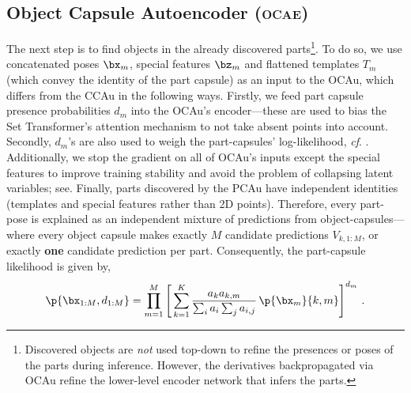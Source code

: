 \subsection{Object Capsule Autoencoder (\textsc{ocae})}
\label{sec:ocae}

The next step is to find objects in the already discovered parts\footnote{
    Discovered objects are {\it not} used top-down to refine the presences or poses of the parts during inference. However, the derivatives backpropagated via \gls{OCAu} refine the lower-level encoder network that infers the parts.
}.
To do so, we use concatenated poses $\bx_m$, special features $\bz_m$ and flattened templates $T_m$ (which convey the identity of the part capsule)
as an input to the \gls{OCAu}, which differs from the \gls{CCAu} in the following ways.
Firstly, we feed part capsule presence probabilities $d_m$ into the \gls{OCAu}'s encoder---these are used to bias the Set Transformer's attention mechanism to not take absent points into account.
Secondly, $d_m$'s are also used to weigh the part-capsules' log-likelihood, \textit{cf}. .
Additionally, we stop the gradient on all of \gls{OCAu}'s inputs except the special features to improve training stability and avoid the problem of collapsing latent variables; see\eg \cite{Rasmus2015ladder}.
Finally, parts discovered by the \gls{PCAu} have independent identities (templates and special features rather than 2D points).
Therefore, every part-pose is explained as an independent mixture of predictions from object-capsules---where every object capsule makes exactly $M$ candidate predictions $V_{k,1:M}$, or exactly {\bf one} candidate prediction per part.
Consequently, the part-capsule likelihood is given by,
\vspace*{-.5em}
\begin{equation}
    \p{\bx_{1:M}, d_{1:M}} = \prod_{m=1}^M \left[\, \sum_{k=1}^K  
    \frac{a_k a_{k,m}}{\sum_i a_i \sum_j a_{i,j}}
    \,\p{\bx_m}{k,m}\right]^{d_m}\,. \label{eq:mod_constellation_likelihood}
\end{equation}

